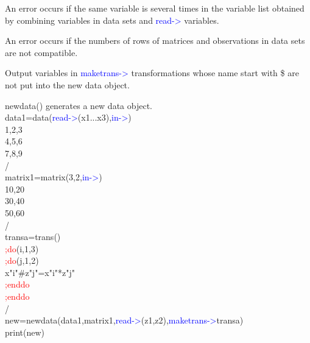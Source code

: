 \begin{note}
An error occurs if the same variable is several times in the variable list obtained
by combining variables in data sets and \textcolor{blue}{read->} variables.
\end{note}
\begin{note}
An error occurs if the numbers of rows of matrices and observations in data sets
are not compatible.
\end{note}
\begin{note}
Output variables in \textcolor{blue}{maketrans->} transformations whose name start with \$ are not put into the new data object.
\end{note}
\begin{example}[newdataex]newdata() generates a new data object.\\
\label{newdataex}
data1=\textcolor{VioletRed}{data}(\textcolor{blue}{read->}(x1...x3),\textcolor{blue}{in->})\\
1,2,3\\
4,5,6\\
7,8,9\\
/\\
matrix1=\textcolor{VioletRed}{matrix}(3,2,\textcolor{blue}{in->})\\
10,20\\
30,40\\
50,60\\
/\\
transa=\textcolor{VioletRed}{trans}()\\
\textcolor{Red}{;do}(i,1,3)\\
\textcolor{Red}{;do}(j,1,2)\\
x"i"\#z"j"=x"i"*z"j"\\
\textcolor{Red}{;enddo}\\
\textcolor{Red}{;enddo}\\
/\\
new=\textcolor{VioletRed}{newdata}(data1,matrix1,\textcolor{blue}{read->}(z1,z2),\textcolor{blue}{maketrans->}transa)\\
\textcolor{VioletRed}{print}(new)
\end{example}

